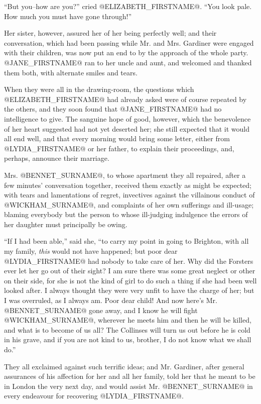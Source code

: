 ``But you--how are you?'' cried @ELIZABETH_FIRSTNAME@. ``You look pale. How much you
must have gone through!''

Her sister, however, assured her of her being perfectly well; and their
conversation, which had been passing while Mr. and Mrs. Gardiner were
engaged with their children, was now put an end to by the approach
of the whole party. @JANE_FIRSTNAME@ ran to her uncle and aunt, and welcomed and
thanked them both, with alternate smiles and tears.

When they were all in the drawing-room, the questions which @ELIZABETH_FIRSTNAME@
had already asked were of course repeated by the others, and they soon
found that @JANE_FIRSTNAME@ had no intelligence to give. The sanguine hope of
good, however, which the benevolence of her heart suggested had not yet
deserted her; she still expected that it would all end well, and that
every morning would bring some letter, either from @LYDIA_FIRSTNAME@ or her father,
to explain their proceedings, and, perhaps, announce their marriage.

Mrs. @BENNET_SURNAME@, to whose apartment they all repaired, after a few minutes'
conversation together, received them exactly as might be expected; with
tears and lamentations of regret, invectives against the villainous
conduct of @WICKHAM_SURNAME@, and complaints of her own sufferings and ill-usage;
blaming everybody but the person to whose ill-judging indulgence the
errors of her daughter must principally be owing.

``If I had been able,'' said she, ``to carry my point in going to Brighton,
with all my family, \textit{this} would not have happened; but poor dear @LYDIA_FIRSTNAME@
had nobody to take care of her. Why did the Forsters ever let her go out
of their sight? I am sure there was some great neglect or other on their
side, for she is not the kind of girl to do such a thing if she had been
well looked after. I always thought they were very unfit to have the
charge of her; but I was overruled, as I always am. Poor dear child!
And now here's Mr. @BENNET_SURNAME@ gone away, and I know he will fight @WICKHAM_SURNAME@,
wherever he meets him and then he will be killed, and what is to become
of us all? The Collinses will turn us out before he is cold in his
grave, and if you are not kind to us, brother, I do not know what we
shall do.''

They all exclaimed against such terrific ideas; and Mr. Gardiner, after
general assurances of his affection for her and all her family, told her
that he meant to be in London the very next day, and would assist Mr.
@BENNET_SURNAME@ in every endeavour for recovering @LYDIA_FIRSTNAME@.

